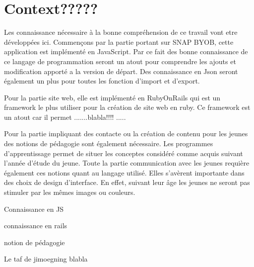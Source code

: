 \section{Context?????}
Les connaissance nécessaire à la bonne compréhension de ce travail vont etre développées ici. Commençons par la partie portant sur SNAP BYOB, cette application est implémenté en JavaScript. Par ce fait des bonne connaissance de ce langage de programmation seront un atout pour comprendre les ajouts et modification apporté a la version de départ. Des connaissance en Json seront également un plus pour toutes les fonction d'import et d'export.

Pour la partie site web, elle est implémenté en RubyOnRails qui est un framework le plus utiliser pour la création de site web en ruby. Ce framework est un atout car il permet .......blabla!!!! .....

Pour la partie impliquant des contacte ou la création de contenu pour les jeunes des notions de pédagogie sont également nécessaire. Les programmes d'apprentissage permet de situer les conceptes considéré comme acquis suivant l'année d'étude du jeune. Toute la partie communication avec les jeunes requière également ces notions quant au langage utilisé. Elles s'avèrent importante dans des choix de design d'interface. En effet, suivant leur âge les jeunes ne seront pas stimuler par les mêmes images ou couleurs.

Connaissance en JS

connaissance en rails

notion de pédagogie

Le taf de jimoegning blabla
